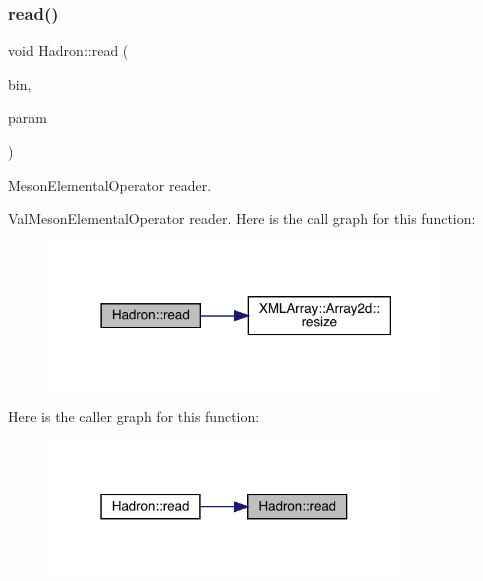 \subsubsection{\texorpdfstring{read()}{read()}\hspace{0.1cm}{\footnotesize\ttfamily [57/94]}}
{\footnotesize\ttfamily void Hadron\+::read (\begin{DoxyParamCaption}\item[{\mbox{\hyperlink{classADATIO_1_1BinaryReader}{Binary\+Reader}} \&}]{bin,  }\item[{\mbox{\hyperlink{structHadron_1_1ValMesonElementalOperator__t}{Val\+Meson\+Elemental\+Operator\+\_\+t}} \&}]{param }\end{DoxyParamCaption})}



Meson\+Elemental\+Operator reader. 

Val\+Meson\+Elemental\+Operator reader. Here is the call graph for this function\+:
\nopagebreak
\begin{figure}[H]
\begin{center}
\leavevmode
\includegraphics[width=297pt]{d1/daf/namespaceHadron_ae34c01603f5e8f9246374fddfaa8e062_cgraph}
\end{center}
\end{figure}
Here is the caller graph for this function\+:
\nopagebreak
\begin{figure}[H]
\begin{center}
\leavevmode
\includegraphics[width=265pt]{d1/daf/namespaceHadron_ae34c01603f5e8f9246374fddfaa8e062_icgraph}
\end{center}
\end{figure}
\mbox{\label{namespaceHadron_a614faa9c1c7ae1880f009d5c9aa672ec}} 
